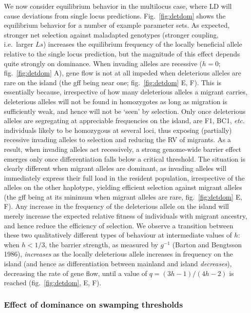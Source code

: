 \documentclass[
  11pt,
]{article}
\begin{document}
We now consider equilibrium behavior in the multilocus case, where LD
will cause deviations from single locus predictions.
Fig.~\ref{fig:detdom} shows the equilibrium behavior for a number of
example parameter sets. As expected, stronger net selection against
maladapted genotypes (stronger coupling, i.e.~larger \(Ls\)) increases
the equilibrium frequency of the locally beneficial allele relative to
the single locus prediction, but the magnitude of this effect depends
quite strongly on dominance. When invading alleles are recessive
(\(h=0\); fig.~\ref{fig:detdom} A), gene flow is not at all impeded when
deleterious alleles are rare on the island (the gff being near one;
fig.~\ref{fig:detdom} E, F). This is essentially because, irrespective
of how many deleterious alleles a migrant carries, deleterious alleles
will not be found in homozygotes as long as migration is sufficiently
weak, and hence will not be `seen' by selection. Only once deleterious
alleles are segregating at appreciable frequencies on the island, are
F1, BC1, \emph{etc.} individuals likely to be homozygous at several
loci, thus exposing (partially) recessive invading alleles to selection
and reducing the RV of migrants. As a result, when invading alleles act
recessively, a strong genome-wide barrier effect emerges only once
differentiation falls below a critical threshold. The situation is
clearly different when migrant alleles are dominant, as invading alleles
will immediately express their full load in the resident population,
irrespective of the alleles on the other haplotype, yielding efficient
selection against migrant alleles (the gff being at its minimum when
migrant alleles are rare, fig.~\ref{fig:detdom} E, F). Any increase in
the frequency of the deleterious allele on the island will merely
increase the expected relative fitness of individuals with migrant
ancestry, and hence reduce the efficiency of selection. We observe a
transition between these two qualitatively different types of behaviour
at intermediate values of \(h\): when \(h<1/3\), the barrier strength,
as measured by \(g^{-1}\) (Barton and Bengtsson 1986), \emph{increases}
as the locally deleterious allele increases in frequency on the island
(and hence as differentiation between mainland and island
\emph{decreases}), decreasing the rate of gene flow, until a value of
\(q=(3h-1)/(4h-2)\) is reached (fig.~\ref{fig:detdom}, E, F).

\hypertarget{effect-of-dominance-on-swamping-thresholds}{%
\subsubsection{Effect of dominance on swamping
thresholds}\label{effect-of-dominance-on-swamping-thresholds}}
\end{document}
